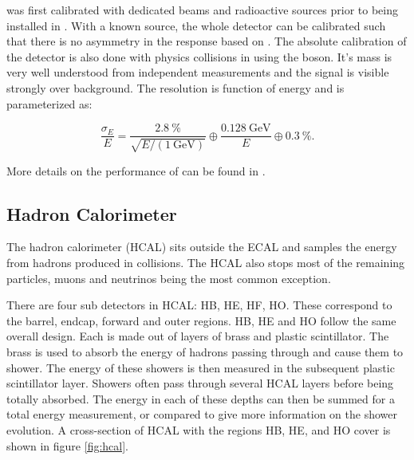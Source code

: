 \ECAL was first calibrated with dedicated beams and radioactive sources prior to being installed in \CMS.  With a known source, the whole detector can be calibrated such that there is no asymmetry in the response based on \etaphi.  The absolute calibration of the detector is also done with physics collisions in \CMS using the \Z boson.  It's mass is very well understood from independent measurements and the signal is visible strongly over background.  The resolution is function of energy and is parameterized as:

\begin{equation}\label{eq:ecal}
    \frac{\sigma_{E}}{E}
    =   
    \frac{\SI{2.8}{\%}}{\sqrt{E/\left(\SI{1}{\GeV}\right)}}
    \oplus
    \frac{\SI{0.128}{\GeV}}{E}
    \oplus
    \SI{0.3}{\%}.
\end{equation}

More details on the performance of \ECAL can be found in \cite{ecalPerf}.

\subsection{Hadron Calorimeter}
The hadron calorimeter (HCAL) sits outside the ECAL and samples the energy from hadrons produced in collisions.  The HCAL also stops most of the remaining particles, muons and neutrinos being the most common exception.

There are four sub detectors in HCAL: HB, HE, HF, HO.  These correspond to the barrel, endcap, forward and outer regions.  HB, HE and HO follow the same overall design.  Each is made out of layers of brass and plastic scintillator.  The brass is used to absorb the energy of hadrons passing through and cause them to shower. The energy of these showers is then measured in the subsequent plastic scintillator layer. Showers often pass through several HCAL layers before being totally absorbed.  The energy in each of these depths can then be summed for a total energy measurement, or compared to give more information on the shower evolution. A cross-section of HCAL with the regions HB, HE, and HO cover is shown in figure \ref{fig:hcal}.

